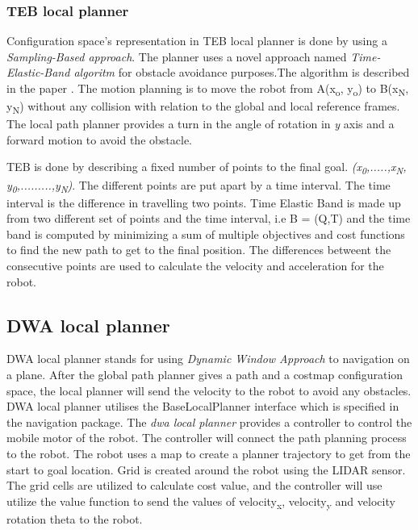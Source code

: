 \subsubsection{TEB local planner}
Configuration space's representation in TEB local planner is done by using a \textit{Sampling-Based approach}.
The planner uses a novel approach named \textit{Time-Elastic-Band algoritm} for obstacle avoidance purposes.The algorithm is described
in the paper \cite{KELLER20149822}. The motion planning is to move the robot from A(x\textsubscript{o}, y\textsubscript{o}) to B(x\textsubscript{N}, y\textsubscript{N}) without any collision with relation to the global and local reference frames.
The local path planner provides a turn in the angle of rotation in \textit{y} axis and a forward motion to avoid the obstacle. 

TEB is done by describing a fixed number of points to the final goal. \textit{(x\textsubscript{0},.....,x\textsubscript{N},
y\textsubscript{0},.........,y\textsubscript{N})}. The different points are put apart by a time interval. The time interval is the difference in travelling two points. Time Elastic Band is made up from 
two different set of points and the time interval, i.e B = (Q,T) and the time band is computed by minimizing a sum of multiple objectives and cost functions to find the new path to get to the final position. The differences betweent the consecutive points are used to calculate the velocity and acceleration for the robot.

\subsection{DWA local planner}
DWA local planner stands for using \textit{Dynamic Window Approach} to navigation on a plane. After the global path planner gives a path and a costmap configuration space, the local planner will send the velocity to the robot to avoid any obstacles.
DWA local planner utilises the BaseLocalPlanner interface which is specified in the navigation package. The \textit{dwa local planner} provides a controller to control the mobile motor of the robot. The controller will connect the path planning process to the robot. The robot uses a map to create a planner trajectory to get from the start to goal location.
Grid is created around the robot using the LIDAR sensor. The grid cells are utilized to calculate cost value, and the controller will use utilize the value function to send the values of velocity\textsubscript{x}, velocity\textsubscript{y} and velocity rotation theta to the robot.

